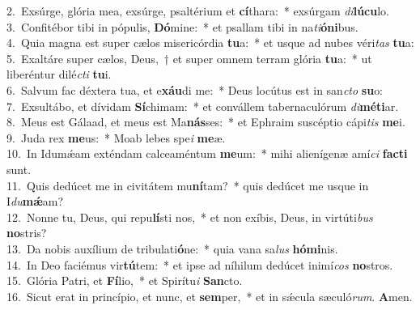 {2.~}Exsúrge, glória mea, exsúrge, psaltérium et \textbf{cí}thara:~* exsúrgam \textit{di}\textbf{lú}\textbf{cu}lo.\\
{3.~}Confitébor tibi in pópulis, \textbf{Dó}mine:~* et psallam tibi in na\textit{ti}\textbf{ó}\textbf{ni}bus.\\
{4.~}Quia magna est super cælos misericórdia \textbf{tu}a:~* et usque ad nubes véri\textit{tas} \textbf{tu}a:\\
{5.~}Exaltáre super cælos, Deus,~† et super omnem terram glória \textbf{tu}a:~* ut liberéntur dilé\textit{cti} \textbf{tu}i.\\
{6.~}Salvum fac déxtera tua, et e\textbf{xáu}di me:~* Deus locútus est in san\textit{cto} \textbf{su}o:\\
{7.~}Exsultábo, et dívidam \textbf{Sí}chimam:~* et convállem tabernaculórum \textit{di}\textbf{mé}\textbf{ti}ar.\\
{8.~}Meus est Gálaad, et meus est Ma\textbf{nás}ses:~* et Ephraim suscéptio cápi\textit{tis} \textbf{me}i.\\
{9.~}Juda rex \textbf{me}us:~* Moab lebes spe\textit{i} \textbf{me}æ.\\
{10.~}In Idumǽam exténdam calceaméntum \textbf{me}um:~* mihi alienígenæ amí\textit{ci} \textbf{fa}\textbf{cti} sunt.\\
{11.~}Quis dedúcet me in civitátem mu\textbf{ní}tam?~* quis dedúcet me usque in I\textit{du}\textbf{mǽ}am?\\
{12.~}Nonne tu, Deus, qui repu\textbf{lí}sti nos,~* et non exíbis, Deus, in virtúti\textit{bus} \textbf{no}stris?\\
{13.~}Da nobis auxílium de tribulati\textbf{ó}ne:~* quia vana sa\textit{lus} \textbf{hó}\textbf{mi}nis.\\
{14.~}In Deo faciémus vir\textbf{tú}tem:~* et ipse ad níhilum dedúcet inimí\textit{cos} \textbf{no}stros.\\
{15.~}Glória Patri, et \textbf{Fí}lio,~* et Spirítu\textit{i} \textbf{San}cto.\\
{16.~}Sicut erat in princípio, et nunc, et \textbf{sem}per,~* et in sǽcula sæculó\textit{rum}. \textbf{A}men.\\
